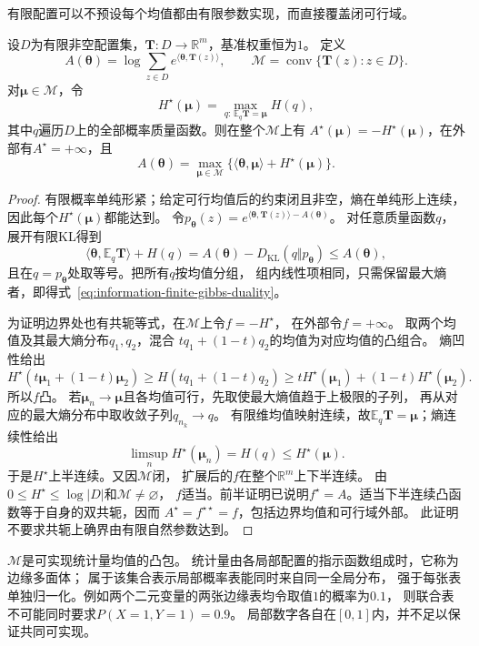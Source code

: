 有限配置可以不预设每个均值都由有限参数实现，而直接覆盖闭可行域。
\begin{theorem}[有限配置上的配分函数与最大熵对偶]
\label{thm:information-finite-entropy-duality}
设\(D\)为有限非空配置集，\(\bm T:D\to\mathbb R^m\)，基准权重恒为\(1\)。
定义
\[
  A(\bm\theta)=\log\sum_{z\in D}e^{\langle\bm\theta,\bm T(z)\rangle},
  \qquad\mathcal M=\operatorname{conv}\{\bm T(z):z\in D\}.
\]
对\(\bm\mu\in\mathcal M\)，令
\[
  H^\star(\bm\mu)=\max_{q:\,\mathbb E_q\bm T=\bm\mu}H(q),
\]
其中\(q\)遍历\(D\)上的全部概率质量函数。则在整个\(\mathcal M\)上有
\(A^\star(\bm\mu)=-H^\star(\bm\mu)\)，在外部有\(A^\star=+\infty\)，且
\begin{equation}
  A(\bm\theta)=\max_{\bm\mu\in\mathcal M}
  \{\langle\bm\theta,\bm\mu\rangle+H^\star(\bm\mu)\}.
  \label{eq:information-finite-gibbs-duality}
\end{equation}
\end{theorem}
\begin{proof}
有限概率单纯形紧；给定可行均值后的约束闭且非空，熵在单纯形上连续，
因此每个\(H^\star(\bm\mu)\)都能达到。
令\(p_{\bm\theta}(z)=e^{\langle\bm\theta,\bm T(z)\rangle-A(\bm\theta)}\)。
对任意质量函数\(q\)，展开有限KL得到
\[
  \langle\bm\theta,\mathbb E_q\bm T\rangle+H(q)
  =A(\bm\theta)-D_{\mathrm{KL}}(q\Vert p_{\bm\theta})
  \leq A(\bm\theta),
\]
且在\(q=p_{\bm\theta}\)处取等号。把所有\(q\)按均值分组，
组内线性项相同，只需保留最大熵者，即得式~\eqref{eq:information-finite-gibbs-duality}。

为证明边界处也有共轭等式，在\(\mathcal M\)上令\(f=-H^\star\)，
在外部令\(f=+\infty\)。
取两个均值及其最大熵分布\(q_1,q_2\)，混合
\(tq_1+(1-t)q_2\)的均值为对应均值的凸组合。
熵凹性给出
\[
  H^\star(t\bm\mu_1+(1-t)\bm\mu_2)
  \geq H(tq_1+(1-t)q_2)
  \geq tH^\star(\bm\mu_1)+(1-t)H^\star(\bm\mu_2).
\]
所以\(f\)凸。
若\(\bm\mu_n\to\bm\mu\)且各均值可行，先取使最大熵值趋于上极限的子列，
再从对应的最大熵分布中取收敛子列\(q_{n_k}\to q\)。
有限维均值映射连续，故\(\mathbb E_q\bm T=\bm\mu\)；熵连续性给出
\[
  \limsup_nH^\star(\bm\mu_n)=H(q)\leq H^\star(\bm\mu).
\]
于是\(H^\star\)上半连续。又因\(\mathcal M\)闭，
扩展后的\(f\)在整个\(\mathbb R^m\)上下半连续。
由\(0\leq H^\star\leq\log|D|\)和\(\mathcal M\neq\varnothing\)，
\(f\)适当。前半证明已说明\(f^\star=A\)。适当下半连续凸函数等于自身的双共轭，因而
\(A^\star=f^{\star\star}=f\)，包括边界均值和可行域外部。
此证明不要求共轭上确界由有限自然参数达到。
\end{proof}

\(\mathcal M\)是可实现统计量均值的凸包。
统计量由各局部配置的指示函数组成时，它称为边缘多面体；
属于该集合表示局部概率表能同时来自同一全局分布，
强于每张表单独归一化。例如两个二元变量的两张边缘表均令取值\(1\)的概率为\(0.1\)，
则联合表不可能同时要求\(P(X=1,Y=1)=0.9\)。
局部数字各自在\([0,1]\)内，并不足以保证共同可实现。

